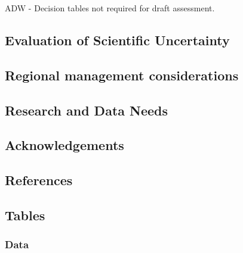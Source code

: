 \documentclass[
]{scrartcl}
\begin{document}
ADW - Decision tables not required for draft assessment.

\subsection{Evaluation of Scientific
Uncertainty}\label{evaluation-of-scientific-uncertainty}

\subsection{Regional management
considerations}\label{regional-management-considerations}

\subsection{Research and Data Needs}\label{research-and-data-needs}

\newpage{}

\subsection{Acknowledgements}\label{sec-acknowledgements}

\newpage{}

\subsection{References}\label{references}

\newpage{}

\subsection{Tables}\label{tables}

\subsubsection{Data}\label{data-1}

\begingroup
\fontsize{9.0pt}{10.8pt}\selectfont
\end{document}
